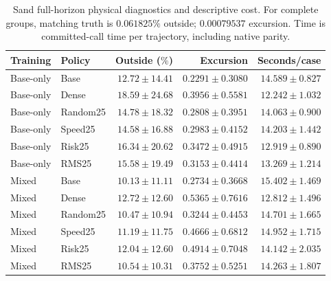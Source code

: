 \begin{table}[!ht]
\centering\small
\setlength{\tabcolsep}{5pt}\renewcommand{\arraystretch}{1.12}
\caption{Sand full-horizon physical diagnostics and descriptive cost. For complete groups, matching truth is $0.061825\%$ outside; $0.00079537$ excursion. Time is committed-call time per trajectory, including native parity.}
\label{tab:sand-all-cost}
\begin{tabular}{llrrr}
\toprule
Training & Policy & Outside ($\%$) & Excursion & Seconds/case\\
\midrule
Base-only & Base & $12.72\pm14.41$ & $0.2291\pm0.3080$ & $14.589\pm0.827$\\
Base-only & Dense & $18.59\pm24.68$ & $0.3956\pm0.5581$ & $12.242\pm1.032$\\
Base-only & Random25 & $14.78\pm18.32$ & $0.2808\pm0.3951$ & $14.063\pm0.900$\\
Base-only & Speed25 & $14.58\pm16.88$ & $0.2983\pm0.4152$ & $14.203\pm1.442$\\
Base-only & Risk25 & $16.34\pm20.62$ & $0.3472\pm0.4915$ & $12.919\pm0.890$\\
Base-only & RMS25 & $15.58\pm19.49$ & $0.3153\pm0.4414$ & $13.269\pm1.214$\\
Mixed & Base & $10.13\pm11.11$ & $0.2734\pm0.3668$ & $15.402\pm1.469$\\
Mixed & Dense & $12.72\pm12.60$ & $0.5365\pm0.7616$ & $12.812\pm1.496$\\
Mixed & Random25 & $10.47\pm10.94$ & $0.3244\pm0.4453$ & $14.701\pm1.665$\\
Mixed & Speed25 & $11.19\pm11.75$ & $0.4666\pm0.6812$ & $14.952\pm1.715$\\
Mixed & Risk25 & $12.04\pm12.60$ & $0.4914\pm0.7048$ & $14.142\pm2.035$\\
Mixed & RMS25 & $10.54\pm10.31$ & $0.3752\pm0.5251$ & $14.263\pm1.807$\\
\bottomrule
\end{tabular}
\end{table}
